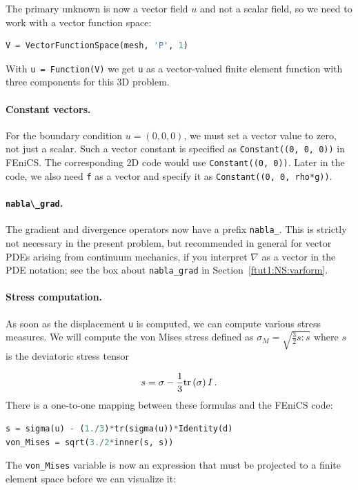 \documentclass[graybox,envcountchap,sectrefs,final]{svmonodo}
\begin{document}
The primary unknown is now a vector field $u$ and not a scalar field,
so we need to work with a vector function space:

\begin{lstlisting}[language=Python,style=graycolor]
V = VectorFunctionSpace(mesh, 'P', 1)
\end{lstlisting}
With \texttt{u = Function(V)} we get \texttt{u} as a vector-valued finite element
function with three components for this 3D problem.

\paragraph{Constant vectors.}
For the boundary condition $u=(0, 0, 0)$, we must set a vector value
to zero, not just a scalar. Such a vector constant is specified as
\texttt{Constant((0, 0, 0))} in FEniCS. The corresponding 2D code would use
\texttt{Constant((0, 0))}. Later in the code, we also need \texttt{f} as a vector
and specify it as \texttt{Constant((0, 0, rho*g))}.

\paragraph{\protect\Verb!nabla\_grad!.}

The gradient and divergence operators now have a prefix \Verb!nabla_!.
This is strictly not necessary in the present problem, but
recommended in general for vector PDEs arising from continuum mechanics,
if you interpret $\nabla$ as a vector in the PDE notation;
see the box about \Verb!nabla_grad! in Section~\ref{ftut1:NS:varform}.

\paragraph{Stress computation.}
As soon as the displacement \texttt{u} is computed, we can compute various
stress measures. We will compute the von Mises stress defined as
$\sigma_M = \sqrt{\frac{3}{2}s:s}$ where $s$ is the deviatoric stress
tensor

\[ s = \sigma - \frac{1}{3}\mathrm{tr}\,(\sigma)\,I\tp\]
There is a one-to-one mapping between these formulas and the FEniCS code:

\begin{lstlisting}[language=Python,style=graycolor]
s = sigma(u) - (1./3)*tr(sigma(u))*Identity(d)
von_Mises = sqrt(3./2*inner(s, s))
\end{lstlisting}
The \Verb!von_Mises! variable is now an expression that must be projected to
a finite element space before we can visualize it:
\end{document}

